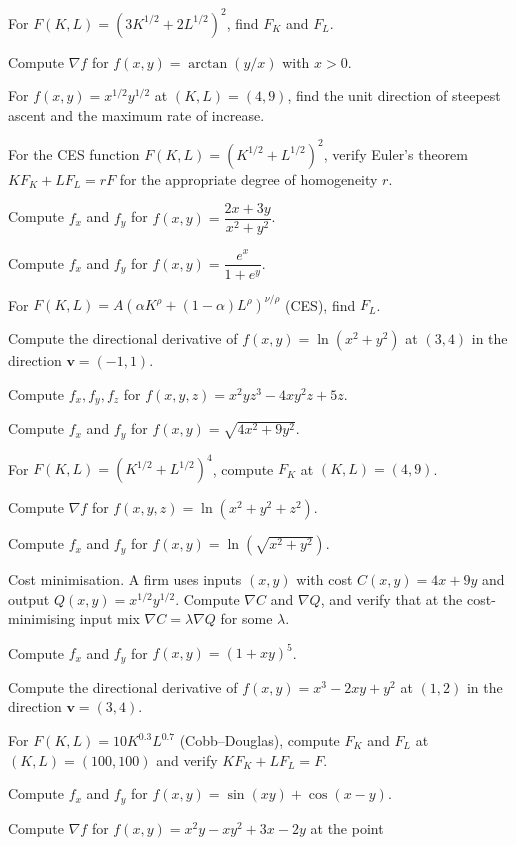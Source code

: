 \begin{problems}
  \item For $F(K,L)=(3K^{1/2}+2L^{1/2})^2$, find $F_K$ and $F_L$.
  \item Compute $\nabla f$ for $f(x,y)=\arctan(y/x)$ with $x>0$.
  \item For $f(x,y)=x^{1/2}y^{1/2}$ at $(K,L)=(4,9)$, find the unit
        direction of steepest ascent and the maximum rate of increase.
  \item For the CES function $F(K,L)=(K^{1/2}+L^{1/2})^2$, verify Euler's
        theorem $KF_K+LF_L=rF$ for the appropriate degree of homogeneity
        $r$.
  \item Compute $f_x$ and $f_y$ for $f(x,y)=\dfrac{2x+3y}{x^2+y^2}$.
  \item Compute $f_x$ and $f_y$ for $f(x,y)=\dfrac{e^x}{1+e^y}$.
  \item For $F(K,L)=A(\alpha K^\rho+(1-\alpha)L^\rho)^{\nu/\rho}$ (CES),
        find $F_L$.
  \item Compute the directional derivative of $f(x,y)=\ln(x^2+y^2)$ at
        $(3,4)$ in the direction $\mathbf{v}=(-1,1)$.
  \item Compute $f_x, f_y, f_z$ for $f(x,y,z)=x^2yz^3-4xy^2z+5z$.
  \item Compute $f_x$ and $f_y$ for $f(x,y)=\sqrt{4x^2+9y^2}$.
  \item For $F(K,L)=(K^{1/2}+L^{1/2})^4$, compute $F_K$ at
        $(K,L)=(4,9)$.
  \item Compute $\nabla f$ for $f(x,y,z)=\ln(x^2+y^2+z^2)$.
  \item Compute $f_x$ and $f_y$ for
        $f(x,y)=\ln\left(\sqrt{x^2+y^2}\right)$.
  \item Cost minimisation. A firm uses inputs $(x,y)$ with cost
        $C(x,y)=4x+9y$ and output $Q(x,y)=x^{1/2}y^{1/2}$. Compute
        $\nabla C$ and $\nabla Q$, and verify that at the cost-minimising
        input mix $\nabla C=\lambda\nabla Q$ for some $\lambda$.
  \item Compute $f_x$ and $f_y$ for $f(x,y)=(1+xy)^5$.
  \item Compute the directional derivative of $f(x,y)=x^3-2xy+y^2$ at
        $(1,2)$ in the direction $\mathbf{v}=(3,4)$.
  \item For $F(K,L)=10K^{0.3}L^{0.7}$ (Cobb--Douglas), compute $F_K$ and
        $F_L$ at $(K,L)=(100,100)$ and verify $KF_K+LF_L=F$.
  \item Compute $f_x$ and $f_y$ for $f(x,y)=\sin(xy)+\cos(x-y)$.
  \item Compute $\nabla f$ for $f(x,y)=x^2y-xy^2+3x-2y$ at the point

\end{problems}
